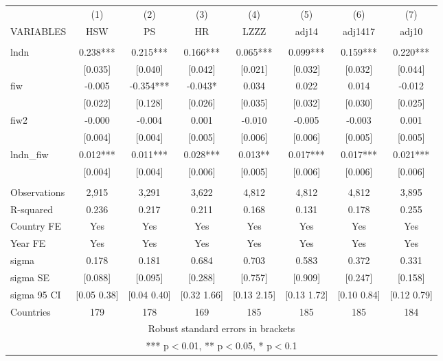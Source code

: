 \begin{tabular}{lccccccc} \hline
 & (1) & (2) & (3) & (4) & (5) & (6) & (7) \\
VARIABLES & HSW & PS & HR & LZZZ & adj14 & adj1417 & adj10 \\ \hline
 &  &  &  &  &  &  &  \\
lndn & 0.238*** & 0.215*** & 0.166*** & 0.065*** & 0.099*** & 0.159*** & 0.220*** \\
 & [0.035] & [0.040] & [0.042] & [0.021] & [0.032] & [0.032] & [0.044] \\
fiw & -0.005 & -0.354*** & -0.043* & 0.034 & 0.022 & 0.014 & -0.012 \\
 & [0.022] & [0.128] & [0.026] & [0.035] & [0.032] & [0.030] & [0.025] \\
fiw2 & -0.000 & -0.004 & 0.001 & -0.010 & -0.005 & -0.003 & 0.001 \\
 & [0.004] & [0.004] & [0.005] & [0.006] & [0.006] & [0.005] & [0.005] \\
lndn\_fiw & 0.012*** & 0.011*** & 0.028*** & 0.013** & 0.017*** & 0.017*** & 0.021*** \\
 & [0.004] & [0.004] & [0.006] & [0.005] & [0.006] & [0.006] & [0.006] \\
 &  &  &  &  &  &  &  \\
Observations & 2,915 & 3,291 & 3,622 & 4,812 & 4,812 & 4,812 & 3,895 \\
R-squared & 0.236 & 0.217 & 0.211 & 0.168 & 0.131 & 0.178 & 0.255 \\
Country FE & Yes & Yes & Yes & Yes & Yes & Yes & Yes \\
Year FE & Yes & Yes & Yes & Yes & Yes & Yes & Yes \\
sigma & 0.178 & 0.181 & 0.684 & 0.703 & 0.583 & 0.372 & 0.331 \\
sigma SE & [0.088] & [0.095] & [0.288] & [0.757] & [0.909] & [0.247] & [0.158] \\
sigma 95 CI & [0.05 0.38] & [0.04 0.40] & [0.32 1.66] & [0.13 2.15] & [0.13 1.72] & [0.10 0.84] & [0.12 0.79] \\
 Countries & 179 & 178 & 169 & 185 & 185 & 185 & 184 \\ \hline
\multicolumn{8}{c}{ Robust standard errors in brackets} \\
\multicolumn{8}{c}{ *** p$<$0.01, ** p$<$0.05, * p$<$0.1} \\
\end{tabular}
